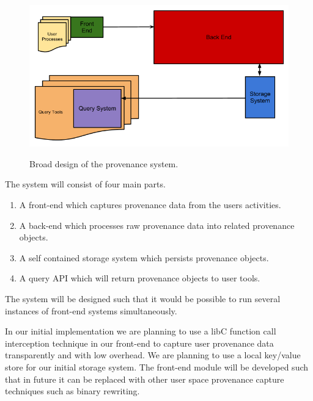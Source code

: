 \begin{figure}
\includegraphics[width=\textwidth]{res/BroadProvDesign.png}
\label{fig:broaddes}
\caption{Broad design of the provenance system.}
\end{figure}
The system will consist of four main parts.
\begin{enumerate}
\item A front-end which captures provenance data from the users activities.
\item A back-end which processes raw provenance data into related provenance objects.
\item A self contained storage system which persists provenance objects.
\item A query API which will return provenance objects to user tools.
\end{enumerate}
The system will be designed such that it would be possible to run several instances of front-end systems simultaneously.

In our initial implementation we are planning to use a libC function call interception technique in our front-end to capture user provenance data transparently and with low overhead. We are planning to use a local key/value store for our initial storage system. The front-end module will be developed such that in future it can be replaced with other user space provenance capture techniques such as binary rewriting.
